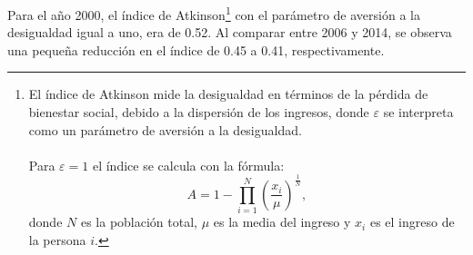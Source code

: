  Para el año 2000, el índice de Atkinson\footnote{El índice de Atkinson mide la desigualdad en términos de la pérdida de bienestar social, debido a la dispersión de los ingresos, donde $\varepsilon$ se interpreta como un parámetro de aversión a la desigualdad.\\\\ 
	Para $\varepsilon = \mbox{1} $ el índice se calcula con la fórmula: 
	\[ A =  1 - \prod_{i=1}^{N}\left(\frac{x_i}{\mu}
\right)^{\frac{1}{N}}, \] donde $N$ es la población total, $\mu$ es la media del ingreso y $x_i$ es el ingreso de la persona $i$.} con el parámetro de aversión a la desigualdad igual a uno, era de 0.52. Al comparar entre 2006 y 2014, se observa una pequeña reducción en el índice de 0.45 a 0.41, respectivamente.